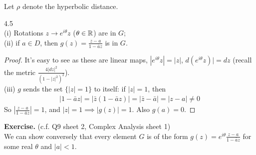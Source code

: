 \documentclass[a4paper]{article}
\begin{document}
Let $\rho$ denote the hyperbolic distance.

\begin{lemma} 4.5\\
(i) Rotations $z \to e^{i\theta} z$ ($\theta \in \mathbb{R}$) are in $G$;\\
(ii) if $a \in D$, then $g(z) = \frac{z-a}{1-\bar{a}z}$ is in $G$.
\begin{proof}
It's easy to see as these are linear maps, $|e^{i\theta} z| = |z|$, $d(e^{i\theta} z)| = dz$ (recall the metric $\frac{4|dz|^2}{(1-|z|^2)^2}$).\\
(iii) $g$ sends the set $\{|z|=1\}$ to itself: if $|z| =1$, then
\begin{equation*}
\begin{aligned}
|1-\bar{a}z| = |\bar{z}(1-\bar{a}z)| =|\bar{z}-\bar{a}| = |z-a| \neq 0
\end{aligned}
\end{equation*}
So $\left|\frac{z-a}{1-\bar{a}z}\right| = 1$, and $|z|=1 \implies |g(z)| = 1$. Also $g(a) = 0$.
\end{proof}
\end{lemma}

\textbf{Exercise.} (c.f. Q9 sheet 2, Complex Analysis sheet 1)\\
We can show conversely that every element $G$ is of the form $g(z) = e^{i\theta} \frac{z-a}{1-\bar{a}z}$ for some real $\theta$ and $|a|<1$.
\end{document}
